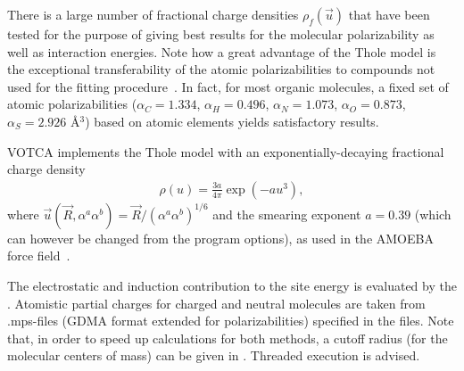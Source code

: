 There is a large number of fractional charge densities $\rho_f(\vec{u})$ that have been tested for the purpose of giving best results for the molecular polarizability as well as interaction energies. Note how a great advantage of the Thole model is the exceptional transferability of the atomic polarizabilities to compounds not used for the fitting procedure~\cite{van_duijnen_molecular_1998}. In fact, for most organic molecules, a fixed set of atomic polarizabilities ($\alpha_C = 1.334$, $\alpha_H = 0.496$, $\alpha_N = 1.073$, $\alpha_O = 0.873$, $\alpha_S = 2.926$ \AA$^3$) based on atomic elements yields satisfactory results.

VOTCA implements the Thole model with an exponentially-decaying fractional charge density
\begin{align}
 \rho(u) = \frac{3a}{4\pi} \exp(-au^3),
\end{align}
where $\vec{u}(\vec{R},\alpha^a \alpha^b) = \vec{R} / (\alpha^a \alpha^b)^{1/6}$ and the smearing exponent $a=0.39$ (which can however be changed from the program options), as used in the AMOEBA force field~\cite{ren_polarizable_2003}.


The electrostatic and induction contribution to the site energy is evaluated by the  \calculator. Atomistic partial charges for charged and neutral molecules are taken from .mps-files (GDMA format extended for polarizabilities) specified in the \xmlcsg files. Note that, in order to speed up calculations for both methods, a cutoff radius (for the molecular centers of mass) can be given in \xmloptions. Threaded execution is advised.

